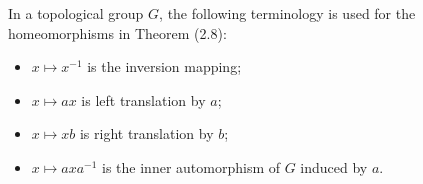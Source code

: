 In a topological group $G$, the following terminology is used for the homeomorphisms in Theorem (2.8):
\begin{itemize}
\item $x \mapsto x^{-1}$ is the inversion mapping;
\item $x \mapsto ax$ is left translation by $a$;
\item $x \mapsto xb$ is right translation by $b$;
\item $x \mapsto axa^{-1}$ is the inner automorphism of $G$ induced by $a$.
\end{itemize}
